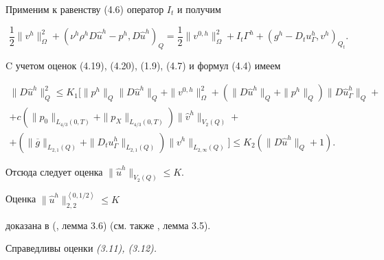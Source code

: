 \documentclass[12pt]{article}
\theoremstyle{plain} %
\newtheorem{propm}{\hskip\parindent Предложение}[section]
\theoremstyle{definition}
\numberwithin{equation}{section}
\begin{document}
\begin{pf} Применим к равенству (4.6) оператор $I_t$ и получим


$$


\frac{1}{2}\|v^h\|^2_\Omega +


(\nu^h\rho^h D\widehat u^h-p^h, D\widehat u^h)_Q =


\frac{1}{2}\|v^{0,h}\|^2_\Omega + I_t\Gamma^h


+ (g^h - D_tu^h_{\Gamma}, v^h)_{Q_t}.


$$


C учетом оценок (4.19), (4.20), (1.9), (4.7) и формул (4.4) имеем


\begin{multline*}


\|D\widehat u^h\|_Q^2\le K_1\bigl[\|p^h\|_Q \|D\widehat u^h\|_Q


+\|v^{0,h}\|_\Omega^2+(\|D\widehat u^h\|_Q +\|p^h\|_Q)


\|D\widehat u^h_\Gamma\|_Q+\\


%


+c(\|p_0\|_{L_{4/3}(0,T)}+\|p_X\|_{L_{4/3}(0,T)})


\|\widehat v^h\|_{V_2(Q)}+\\


%


+(\|\overline g\|_{L_{2,1}(Q)} + \|D_t u^h_\Gamma\|_{L_{2,1}(Q)})


\|v^h\|_{L_{2,\infty}(Q)}\bigr]\le K_2(\|D\widehat u^h\|_Q +1).


\end{multline*}


Отсюда следует оценка $\|\widehat u^h\|_{V_2(Q)}\le K$.


Оценка $\|\widehat u^h\|_{2,2}^{\left<0,1/2\right>}\le K$


доказана в (\cite{Amo9}, лемма 3.6) (см. также \cite{Amo7}, лемма 3.5).


\end{pf}





\begin{propm} Справедливы оценки {\em (3.11), (3.12).}


\end{propm}
\end{document}
